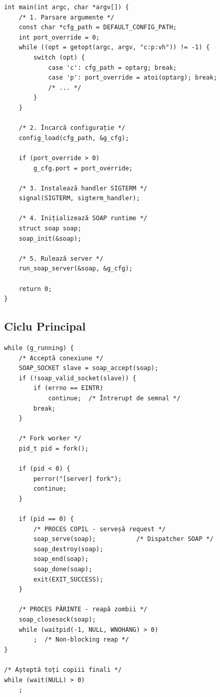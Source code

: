\documentclass[12pt,a4paper,oneside]{book}
\begin{document}
\begin{lstlisting}[caption=Inițializare server]
int main(int argc, char *argv[]) {
    /* 1. Parsare argumente */
    const char *cfg_path = DEFAULT_CONFIG_PATH;
    int port_override = 0;
    while ((opt = getopt(argc, argv, "c:p:vh")) != -1) {
        switch (opt) {
            case 'c': cfg_path = optarg; break;
            case 'p': port_override = atoi(optarg); break;
            /* ... */
        }
    }
    
    /* 2. Încarcă configurație */
    config_load(cfg_path, &g_cfg);
    
    if (port_override > 0)
        g_cfg.port = port_override;
    
    /* 3. Instalează handler SIGTERM */
    signal(SIGTERM, sigterm_handler);
    
    /* 4. Inițializează SOAP runtime */
    struct soap soap;
    soap_init(&soap);
    
    /* 5. Rulează server */
    run_soap_server(&soap, &g_cfg);
    
    return 0;
}
\end{lstlisting}

\subsection{Ciclu Principal}

\begin{lstlisting}[caption=Ciclu principal de acceptare]
while (g_running) {
    /* Acceptă conexiune */
    SOAP_SOCKET slave = soap_accept(soap);
    if (!soap_valid_socket(slave)) {
        if (errno == EINTR) 
            continue;  /* Întrerupt de semnal */
        break;
    }
    
    /* Fork worker */
    pid_t pid = fork();
    
    if (pid < 0) {
        perror("[server] fork");
        continue;
    }
    
    if (pid == 0) {
        /* PROCES COPIL - serveșă request */
        soap_serve(soap);           /* Dispatcher SOAP */
        soap_destroy(soap);
        soap_end(soap);
        soap_done(soap);
        exit(EXIT_SUCCESS);
    }
    
    /* PROCES PĂRINTE - reapă zombii */
    soap_closesock(soap);
    while (waitpid(-1, NULL, WNOHANG) > 0)
        ;  /* Non-blocking reap */
}

/* Așteptă toți copiii finali */
while (wait(NULL) > 0)
    ;
\end{lstlisting}
\end{document}
